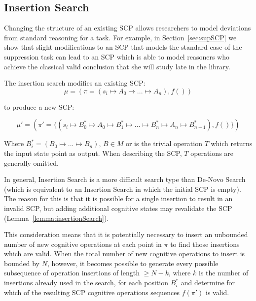 \subsection{Insertion Search}\label{ssec:insertion}

Changing the structure of an existing SCP allows researchers to model deviations from standard reasoning for a task. For example, in Section~\ref{sec:supSCP} we show that slight modifications to an SCP that models the standard case of the suppression task can lead to an SCP which is able to model reasoners who achieve the classical valid conclusion that she will study late in the library.

The insertion search modifies an existing SCP:
\[\mu=(\pi=(s_i \longmapsto A_0 \longmapsto ... \longmapsto A_n),f())\]

to produce a new SCP:

\[
\mu'=(\pi'=\{(s_i \longmapsto B^*_0 \longmapsto A_0 \longmapsto B^*_1 \longmapsto ... \longmapsto  B^*_n \longmapsto A_n \longmapsto  B^*_{n+1}),f()\})
\] 

Where $B^*_i = (B_0\longmapsto ...\longmapsto B_n)$, $B \in M$  or is the trivial operation $T$ which returns the input state point as output. When describing the SCP, $T$ operations are generally omitted.

In general, Insertion Search is a more difficult search type than De-Novo Search (which is equivalent to an Insertion Search in which the initial SCP is empty). The reason for this is that it is possible for a single insertion to result in an invalid SCP, but adding additional cognitive states may revalidate the SCP (Lemma~\ref{lemma:insertionSearch}).

This consideration means that it is potentially necessary to insert an unbounded number of new cognitive operations at each point in $\pi$ to find those insertions which are valid. When the total number of new cognitive operations to insert is bounded by $N$, however, it becomes possible to generate every possible subsequence of operation insertions of length $\geq N-k$, where $k$ is the number of insertions already used in the search, for each position $B^*_i$ and determine for which of the resulting SCP cognitive operations sequences $f(\pi')$ is valid.












